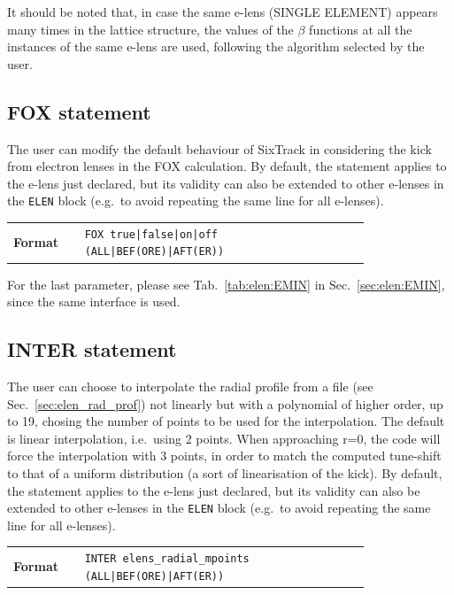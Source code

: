 \bigskip
\noindent It should be noted that, in case the same e-lens (SINGLE ELEMENT) appears many times in the lattice structure, the values of the $\beta$ functions at all the instances of the same e-lens are used, following the algorithm selected by the user.

\subsection{FOX statement}\label{sec:elen:FOX}
The user can modify the default behaviour of SixTrack in considering the kick from electron lenses in the FOX calculation. By default, the statement applies to the e-lens just declared, but its validity can also be extended to other e-lenses in the \texttt{ELEN} block (e.g.~to avoid repeating the same line for all e-lenses).

\bigskip
\begin{tabular}{@{}lp{0.8\linewidth}}
    \textbf{Format}     & \texttt{FOX true|false|on|off (ALL|BEF(ORE)|AFT(ER))} \\
\end{tabular}

\bigskip
\noindent For the last parameter, please see Tab.~\ref{tab:elen:EMIN} in Sec.~\ref{sec:elen:EMIN}, since the same interface is used.

\subsection{INTER statement}\label{sec:elen:INTER}
The user can choose to interpolate the radial profile from a file (see Sec.~\ref{sec:elen_rad_prof}) not linearly but with a polynomial of higher order, up to 19, chosing the number of points to be used for the interpolation. The default is linear interpolation, i.e.~using 2 points. When approaching r=0, the code will force the interpolation with 3 points, in order to match the computed tune-shift to that of a uniform distribution (a sort of linearisation of the kick). By default, the statement applies to the e-lens just declared, but its validity can also be extended to other e-lenses in the \texttt{ELEN} block (e.g.~to avoid repeating the same line for all e-lenses).

\bigskip
\begin{tabular}{@{}lp{0.8\linewidth}}
    \textbf{Format}     & \texttt{INTER elens\_radial\_mpoints (ALL|BEF(ORE)|AFT(ER))} \\
\end{tabular}

